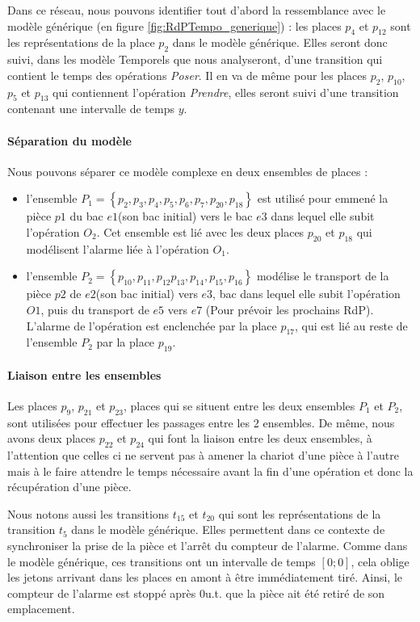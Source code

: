 Dans ce réseau, nous pouvons identifier tout d'abord la ressemblance avec le modèle générique (en figure \ref{fig:RdPTempo_generique}) : les places $p_4$ et $p_{12}$ sont les représentations de la place $p_2$ dans le modèle générique. Elles seront donc suivi, dans les modèle Temporels que nous analyseront, d'une transition qui contient le temps des opérations \emph{Poser}. Il en va de même pour les places $p_2$, $p_{10}$, $p_{5}$ et $p_{13}$ qui contiennent l'opération \emph{Prendre}, elles seront suivi d'une transition contenant une intervalle de temps $y$.

\paragraph*{Séparation du modèle}
Nous pouvons séparer ce modèle complexe en deux ensembles de places : \begin{itemize}
\item l'ensemble $P_1 =\left\lbrace p_2,p_3,p_4,p_5,p_6,p_7,p_{20},p_{18}\right\rbrace$ est utilisé pour emmené la pièce $p1$ du bac $e1$(son bac initial) vers le bac $e3$ dans lequel elle subit l'opération $O_2$. Cet ensemble est lié avec les deux places $p_{20}$ et $p_{18}$ qui modélisent l'alarme liée à l'opération $O_1$.
\item  l'ensemble $P_2 =\left\lbrace p_{10}, p_{11}, p_{12} p_{13}, p_{14}, p_{15}, p_{16}\right\rbrace$ modélise le transport de la pièce $p2$ de $e2$(son bac initial) vers $e3$, bac dans lequel elle subit l'opération $O1$, puis du transport de $e5$ vers $e7$ (Pour prévoir les prochains RdP). L'alarme de l'opération est enclenchée par la place $p_{17}$, qui est lié au reste de l'ensemble $P_2$ par la place $p_{19}$.
\end{itemize}
	
\paragraph*{Liaison entre les ensembles}
Les places $p_9$, $p_{21}$ et $p_{23}$, places qui se situent entre les deux ensembles $P_1$ et $P_2$, sont utilisées pour effectuer les passages entre les 2 ensembles. De même, nous avons deux places $p_{22}$ et $p_{24}$ qui font la liaison entre les deux ensembles, à l'attention que celles ci ne servent pas à amener la chariot d'une pièce à l'autre mais à le faire attendre le temps nécessaire avant la fin d'une opération et donc la récupération d'une pièce.


Nous notons aussi les transitions $t_{15}$ et $t_{20}$ qui sont les représentations de la transition $t_5$ dans le modèle générique. Elles permettent dans ce contexte de synchroniser la prise de la pièce et l'arrêt du compteur de l'alarme. Comme dans le modèle générique, ces transitions ont un intervalle de temps $[0;0]$, cela oblige les jetons arrivant dans les places en amont à être immédiatement tiré. Ainsi, le compteur de l'alarme est stoppé après $0$u.t. que la pièce ait été retiré de son emplacement.


